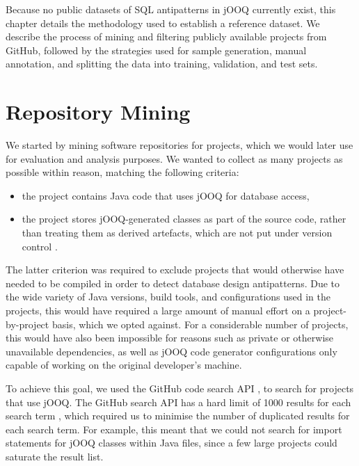 Because no public datasets of SQL antipatterns in jOOQ currently exist, this chapter details the methodology used to establish a reference dataset. We describe the process of mining and filtering publicly available projects from GitHub, followed by the strategies used for sample generation, manual annotation, and splitting the data into training, validation, and test sets.

\section{Repository Mining}\label{sec:mining}

We started by mining software repositories for projects, which we would later use for evaluation and analysis purposes. We wanted to collect as many projects as possible within reason, matching the following criteria:
\begin{itemize}
    \item the project contains Java code that uses jOOQ for database access,
    \item the project stores jOOQ-generated classes as part of the source code, rather than treating them as derived artefacts, which are not put under version control .
\end{itemize}

The latter criterion was required to exclude projects that would otherwise have needed to be compiled in order to detect database design antipatterns. Due to the wide variety of Java versions, build tools, and configurations used in the projects, this would have required a large amount of manual effort on a project-by-project basis, which we opted against. For a considerable number of projects, this would have also been impossible for reasons such as private or otherwise unavailable dependencies, as well as jOOQ code generator configurations only capable of working on the original developer's machine.

To achieve this goal, we used the GitHub code search API , to search for projects that use jOOQ. The GitHub search API has a hard limit of \num{1000} results for each search term , which required us to minimise the number of duplicated results for each search term. For example, this meant that we could not search for import statements for jOOQ classes within Java files, since a few large projects could saturate the result list.

